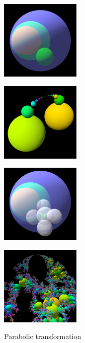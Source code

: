 \begin{figure}[h!tbp]
  \begin{minipage}{0.24\hsize}
   \center
   \includegraphics[width=1.5in, height=1.5in, keepaspectratio]{../img/klein/3diis/parabolicOneGen.pdf}
   \label{fig:parabolicGen3d}
  \end{minipage}
  \hspace*{\fill}
  \begin{minipage}{0.24\hsize}
   \center
   \includegraphics[width=1.5in, height=1.5in, keepaspectratio]{../img/klein/3diis/parabolicOneOrb.pdf}
   \label{fig:parabolicOrb3d}
  \end{minipage}
  \hspace*{\fill}
  \begin{minipage}{0.24\hsize}
   \center
   \includegraphics[width=1.5in, height=1.5in, keepaspectratio]{../img/klein/3diis/parabolicGen.pdf}
   \label{}
  \end{minipage}
 \hspace*{\fill}
 \begin{minipage}{0.24\hsize}
  \center
  \includegraphics[width=1.5in, height=1.5in, keepaspectratio]{../img/klein/3diis/parabolicOrb.pdf}
   \label{}
 \end{minipage}
 \hspace*{\fill}
  \caption{Parabolic transformation}
 \label{}
\end{figure}

